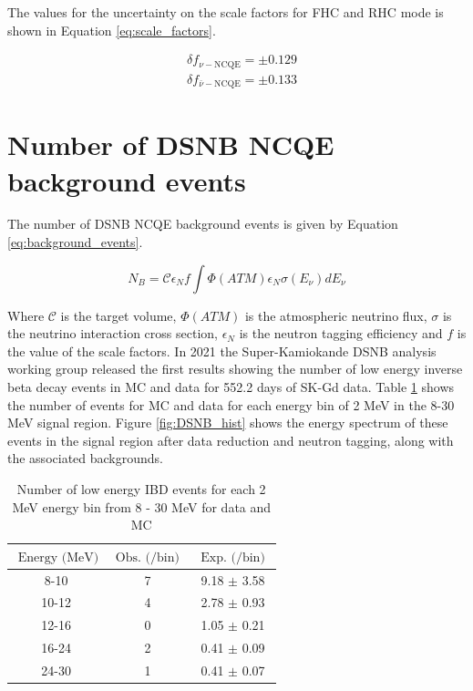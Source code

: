 The values for the uncertainty on the scale factors for FHC and RHC mode is shown in Equation \ref{eq:scale_factors}.


\begin{equation}
    \begin{aligned}
    & \delta{f_{\nu-\mathrm{NCQE}}}= \pm 0.129 \\
    & \delta{f_{\bar{\nu}-\mathrm{NCQE}}}= \pm 0.133
    \label{eq:scale_factors}
    \end{aligned}
\end{equation}


\section{Number of DSNB NCQE background events}

The number of DSNB NCQE background events is given by Equation \ref{eq:background_events}. 

\begin{equation}
N_{B} = \mathcal{C} \epsilon_{N} f\int \Phi(ATM) \epsilon_{N} \sigma(E_{\nu}) d E_{\nu} 
\label{eq:background_events}
\end{equation}

Where $\mathcal{C}$ is the target volume, $\Phi(ATM)$ is the atmospheric neutrino flux, $\sigma$ is the neutrino interaction cross section, $\epsilon_{N}$ is the neutron tagging efficiency and $f$ is the value of the scale factors. In 2021 the Super-Kamiokande DSNB analysis working group released the first results showing the number of low energy inverse beta decay events in MC and data for 552.2 days of SK-Gd data. Table \ref{table:DSNB_analysis} shows the number of events for MC and data for each energy bin of 2 MeV in the 8-30 MeV signal region. Figure \ref{fig:DSNB_hist} shows the energy spectrum of these events in the signal region after data reduction and neutron tagging, along with the associated backgrounds.

\begin{table}[!htb]
\centering
\begin{tabular}{ccc}
\hline
$\text{ Energy (MeV)}$ & $\text{ Obs. (/bin) }$ & $\text{ Exp. (/bin) }$\\
\hline 
8-10 & 7 & 9.18 $\pm$ 3.58 \\
10-12 & 4 & 2.78 $\pm$ 0.93 \\
12-16 & 0 & 1.05 $\pm$ 0.21 \\
16-24 & 2 & 0.41 $\pm$ 0.09 \\
24-30 & 1 & 0.41 $\pm$ 0.07 \\
\hline
\end{tabular}
\caption{Number of low energy IBD events for each 2 MeV energy bin from 8 - 30 MeV for data and MC}
\label{table:DSNB_analysis}
\end{table}


